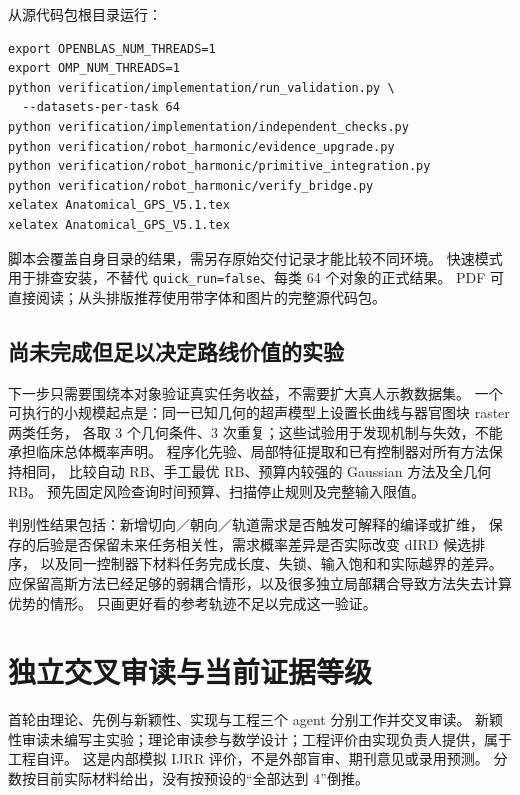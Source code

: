 \documentclass[11pt,a4paper]{article}
\numberwithin{equation}{section}
\theoremstyle{definition}
\begin{document}
从源代码包根目录运行：
\par\noindent
\begin{minipage}{\linewidth}\small
\begin{verbatim}
export OPENBLAS_NUM_THREADS=1
export OMP_NUM_THREADS=1
python verification/implementation/run_validation.py \
  --datasets-per-task 64
python verification/implementation/independent_checks.py
python verification/robot_harmonic/evidence_upgrade.py
python verification/robot_harmonic/primitive_integration.py
python verification/robot_harmonic/verify_bridge.py
xelatex Anatomical_GPS_V5.1.tex
xelatex Anatomical_GPS_V5.1.tex
\end{verbatim}
\end{minipage}
脚本会覆盖自身目录的结果，需另存原始交付记录才能比较不同环境。
快速模式用于排查安装，不替代 \texttt{quick\_run=false}、每类 64 个对象的正式结果。
PDF 可直接阅读；从头排版推荐使用带字体和图片的完整源代码包。

\subsection{尚未完成但足以决定路线价值的实验}
下一步只需要围绕本对象验证真实任务收益，不需要扩大真人示教数据集。
一个可执行的小规模起点是：同一已知几何的超声模型上设置长曲线与器官图块 raster 两类任务，
各取 3 个几何条件、3 次重复；这些试验用于发现机制与失效，不能承担临床总体概率声明。
程序化先验、局部特征提取和已有控制器对所有方法保持相同，
比较自动 RB、手工最优 RB、预算内较强的 Gaussian 方法及全几何 RB。
预先固定风险查询时间预算、扫描停止规则及完整输入限值。

判别性结果包括：新增切向／朝向／轨道需求是否触发可解释的编译或扩维，
保存的后验是否保留未来任务相关性，需求概率差异是否实际改变 dIRD 候选排序，
以及同一控制器下材料任务完成长度、失锁、输入饱和和实际越界的差异。
应保留高斯方法已经足够的弱耦合情形，以及很多独立局部耦合导致方法失去计算优势的情形。
只画更好看的参考轨迹不足以完成这一验证。

\section{独立交叉审读与当前证据等级}
\label{app:reviews}

首轮由理论、先例与新颖性、实现与工程三个 agent 分别工作并交叉审读。
新颖性审读未编写主实验；理论审读参与数学设计；工程评价由实现负责人提供，属于工程自评。
这是内部模拟 IJRR 评价，不是外部盲审、期刊意见或录用预测。
分数按目前实际材料给出，没有按预设的“全部达到 4”倒推。
\end{document}
